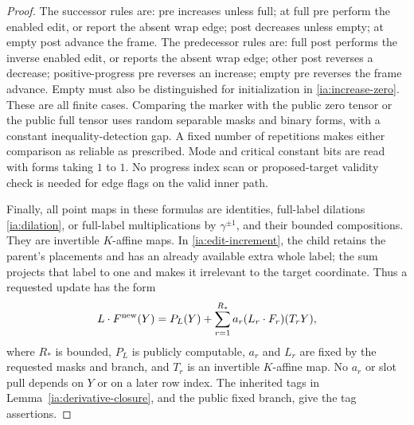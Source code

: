 \begin{proof}
The successor rules are: pre increases unless full; at full pre
perform the enabled edit, or report the absent wrap edge; post
decreases unless empty; at empty post advance the frame.  The
predecessor rules are: full post performs the inverse enabled edit,
or reports the absent wrap edge; other post reverses a decrease;
positive-progress pre reverses an increase; empty pre reverses the
frame advance.  Empty must also be distinguished for initialization
in \eqref{ia:increase-zero}.  These are all finite cases.  Comparing
the marker with the public zero tensor or the public full tensor
uses random separable masks and binary forms, with a constant
inequality-detection gap.  A fixed number of repetitions makes
either comparison as reliable as prescribed.  Mode and critical
constant bits are read with forms taking $1$ to $1$.  No progress
index scan or proposed-target validity check is needed for edge
flags on the valid inner path.

Finally, all point maps in these formulas are identities, full-label
dilations \eqref{ia:dilation}, or full-label multiplications by
$\gamma^{\pm1}$, and their bounded compositions.  They are
invertible $K$-affine maps.  In \eqref{ia:edit-increment}, the child
retains the parent's placements and has an already available extra
whole label; the sum projects that label to one and makes it
irrelevant to the target coordinate.  Thus a requested update has
the form
\begin{equation}
 L\cdot F^{\rm new}(Y)
    =P_L(Y)+\sum_{r=1}^{R_*}a_r
                         (L_r\cdot F_r)(T_rY),    \label{ia:affine-update}
\end{equation}
where $R_*$ is bounded, $P_L$ is publicly computable, $a_r$ and
$L_r$ are fixed by the requested masks and branch, and $T_r$ is
an invertible $K$-affine map.  No $a_r$ or slot pull depends on
$Y$ or on a later row index.  The inherited tags in
Lemma~\ref{ia:derivative-closure}, and the public fixed branch,
give the tag assertions.
\end{proof}

